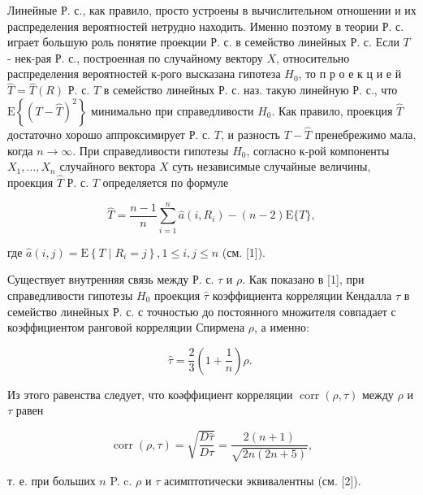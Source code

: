 \documentclass[10pt]{article}
\begin{document}
Линейные Р. с., как правило, просто устроены в вычислительном отношении и их распределения вероятностей нетрудно находить. Именно поэтому в теории Р. с. играет большую роль понятие проекции Р. с. в семейство линейных Р. с. Если $T$ - нек-рая Р. с., построенная по случайному вектору $X$, относительно распределения вероятностей к-рого высказана гипотеза $H_{0}$, то п р о е к ц и е й $\widehat{T}=\widehat{T}(R)$ Р. с. $T$ в семейство линейных Р. с. наз. такую линейную Р. с., что $\mathrm{E}\left\{(T-\widehat{T})^{2}\right\}$ минимально при справедливости $H_{0}$. Как правило, проекция $\widehat{T}$ достаточно хорошо аппроксимирует Р. с. $T$, и разность $T-\hat{T}$ пренебрежимо мала, когда $n \rightarrow \infty$. При справедливости гипотезы $H_{0}$, согласно к-рой компоненты $X_{1}, \ldots, X_{n}$ случайного вектора $X$ суть независимые случайные величины, проекция $\hat{T}$ Р. с. $T$ определяется по формуле



\[

\widehat{T}=\frac{n-1}{n} \sum_{i=1}^{n} \hat{a}\left(i, R_{i}\right)-(n-2) \mathrm{E}\{T\},

\]



где $\hat{a}(i, j)=\mathrm{E}\left\{T \mid R_{i}=j\right\}, 1 \leqslant i, j \leqslant n$ (см. [1]).



Существует внутренняя связь между Р. с. $\tau$ и $\rho$. Как показано в [1], при справедливости гипотезы $H_{0}$ проекция $\hat{\tau}$ коэффициента корреляции Кендалла $\tau$ в семейство линейных Р. с. с точностью до постоянного множителя совпадает с коэффициентом ранговой корреляции Спирмена $\rho$, а именно:



\[

\hat{\tau}=\frac{2}{3}\left(1+\frac{1}{n}\right) \rho \text {. }

\]



Из этого равенства следует, что коәффициент корреляции $\operatorname{corr}(\rho, \tau)$ между $\rho$ и $\tau$ равен



\[

\operatorname{corr}(\rho, \tau)=\sqrt{\frac{D \hat{\tau}}{D \tau}}=\frac{2(n+1)}{\sqrt{2 n(2 n+5)}},

\]



т. е. при больших $n$ P. c. $\rho$ и $\tau$ асимптотически эквивалентны (см. [2]).
\end{document}
